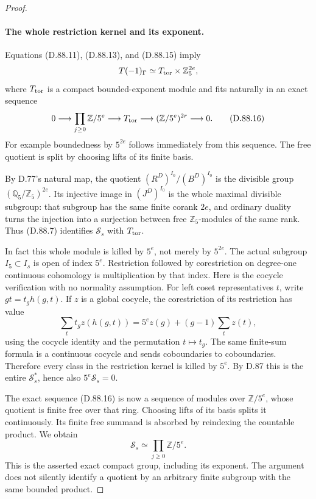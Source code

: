 \begin{proof}
\paragraph{The whole restriction kernel and its exponent.}
Equations (D.88.11), (D.88.13), and (D.88.15) imply
\[
 T(-1)_\Gamma\simeq T_{\rm tor}\times\mathbb Z_5^{2e},
\]
where \(T_{\rm tor}\) is a compact bounded-exponent module
and fits naturally in an exact sequence
\[
 0\longrightarrow\prod_{j\ge0}\mathbb Z/5^e
    \longrightarrow T_{\rm tor}
    \longrightarrow(\mathbb Z/5^e)^{2r}\longrightarrow0.
                                                               \tag{D.88.16}
\]
For example boundedness by \(5^{2e}\) follows immediately
from this sequence. The free quotient is split by choosing
lifts of its finite basis.

By D.77's natural map, the quotient
\((R^D)^{I_0}/(B^D)^{I_0}\) is the divisible group
\((\mathbb Q_5/\mathbb Z_5)^{2e}\). Its injective image
in \((J^D)^{I_0}\) is the whole maximal divisible subgroup:
that subgroup has the same finite corank \(2e\), and
ordinary duality turns the injection into a surjection between
free \(\mathbb Z_5\)-modules of the same rank. Thus
(D.88.7) identifies \(\mathcal S_s\) with \(T_{\rm tor}\).

In fact this whole module is killed by \(5^e\), not merely
by \(5^{2e}\). The actual subgroup \(I_5\subset I_s\)
is open of index \(5^e\). Restriction followed by
corestriction on degree-one continuous cohomology is
multiplication by that index.\cite[II, Proposition 1.30]{PBC_MilneCFT}
Here is the cocycle verification
with no normality assumption. For left coset representatives
\(t\), write \(gt=t_g h(g,t)\). If \(z\) is a global
cocycle, the corestriction of its restriction has value
\[
 \sum_t t_g z(h(g,t))
   =5^e z(g)+(g-1)\sum_t z(t),
                                                               \tag{D.88.17}
\]
using the cocycle identity and the permutation \(t\mapsto t_g\).
The same finite-sum formula is a continuous cocycle and sends
coboundaries to coboundaries. Therefore every class in the
restriction kernel is killed by \(5^e\). By D.87 this is
the entire \(\mathcal S_s^*\), hence also
\(5^e\mathcal S_s=0\).

The exact sequence (D.88.16) is now a sequence of modules over
\(\mathbb Z/5^e\), whose quotient is finite free over that
ring. Choosing lifts of its basis splits it continuously.
Its finite free summand is absorbed by reindexing the countable
product. We obtain
\[
                       \mathcal S_s\simeq
                            \prod_{j\ge0}\mathbb Z/5^e.
\]
This is the asserted exact compact group, including its exponent.
The argument does not silently identify a quotient by an
arbitrary finite subgroup with the same bounded product.


\end{proof}
